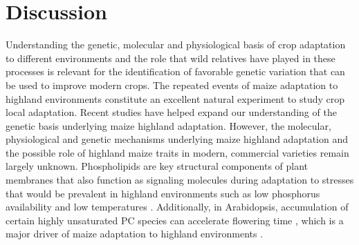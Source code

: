 \documentclass[9pt,twocolumn,twoside,lineno]{BioRxiv}
\begin{document}
 \section{Discussion}
\label{sec:discussion}
Understanding the genetic, molecular and  physiological basis of crop adaptation to different environments and the role that wild relatives have played in these processes is relevant for the identification of favorable genetic variation that can be used to improve modern crops.
The repeated events of maize adaptation to highland environments constitute an excellent natural experiment to study crop local adaptation. 
Recent studies \cite{Wang2020-mp, Takuno2015-uj, Crow2020-gene} have helped expand our understanding of the genetic basis underlying maize highland adaptation. However, the molecular, physiological and genetic mechanisms underlying maize highland adaptation and the possible role of highland maize traits in modern, commercial varieties remain largely unknown.
Phospholipids are key structural components of plant membranes that also function as signaling molecules during adaptation to stresses that would be prevalent in highland environments \cite{Ryu2004-iv, Nakamura2017-vb} such as low phosphorus availability \cite{Veneklaas2012-ls, Cruz-Ramirez2004-ib, Lambers2012-an} and low temperatures \cite{Degenkolbe2012-wf, Welti2002-uk, Marla2017-ph}. 
Additionally, in Arabidopsis, accumulation of certain highly unsaturated PC species can accelerate flowering time \cite{Nakamura2014-qf}, which is a major driver of maize adaptation to highland environments \cite{Romero_Navarro2017-cn, Gates2019-xu, Mercer2019-vj}.
\end{document}
